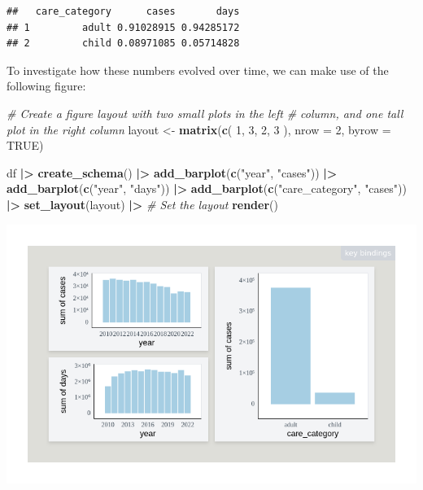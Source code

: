 \documentclass[
]{book}
\newenvironment{Shaded}{\begin{snugshade}}{\end{snugshade}}
\newcommand{\AttributeTok}[1]{\textcolor[rgb]{0.13,0.29,0.53}{#1}}
\newcommand{\CommentTok}[1]{\textcolor[rgb]{0.56,0.35,0.01}{\textit{#1}}}
\newcommand{\ConstantTok}[1]{\textcolor[rgb]{0.56,0.35,0.01}{#1}}
\newcommand{\DecValTok}[1]{\textcolor[rgb]{0.00,0.00,0.81}{#1}}
\newcommand{\FunctionTok}[1]{\textcolor[rgb]{0.13,0.29,0.53}{\textbf{#1}}}
\newcommand{\NormalTok}[1]{#1}
\newcommand{\OtherTok}[1]{\textcolor[rgb]{0.56,0.35,0.01}{#1}}
\newcommand{\SpecialCharTok}[1]{\textcolor[rgb]{0.81,0.36,0.00}{\textbf{#1}}}
\newcommand{\StringTok}[1]{\textcolor[rgb]{0.31,0.60,0.02}{#1}}
\theoremstyle{definition}
\theoremstyle{definition}
\theoremstyle{definition}
\theoremstyle{definition}
\theoremstyle{remark}
\begin{document}
\begin{verbatim}
##   care_category      cases       days
## 1         adult 0.91028915 0.94285172
## 2         child 0.08971085 0.05714828
\end{verbatim}

To investigate how these numbers evolved over time, we can make use of the following figure:

\begin{Shaded}
\begin{Highlighting}[]
\CommentTok{\# Create a figure layout with two small plots in the left}
\CommentTok{\# column, and one tall plot in the right column}
\NormalTok{layout }\OtherTok{\textless{}{-}} \FunctionTok{matrix}\NormalTok{(}\FunctionTok{c}\NormalTok{(}
  \DecValTok{1}\NormalTok{, }\DecValTok{3}\NormalTok{,}
  \DecValTok{2}\NormalTok{, }\DecValTok{3}
\NormalTok{), }\AttributeTok{nrow =} \DecValTok{2}\NormalTok{, }\AttributeTok{byrow =} \ConstantTok{TRUE}\NormalTok{)}

\NormalTok{df }\SpecialCharTok{|\textgreater{}}
  \FunctionTok{create\_schema}\NormalTok{() }\SpecialCharTok{|\textgreater{}}
  \FunctionTok{add\_barplot}\NormalTok{(}\FunctionTok{c}\NormalTok{(}\StringTok{"year"}\NormalTok{, }\StringTok{"cases"}\NormalTok{)) }\SpecialCharTok{|\textgreater{}}
  \FunctionTok{add\_barplot}\NormalTok{(}\FunctionTok{c}\NormalTok{(}\StringTok{"year"}\NormalTok{, }\StringTok{"days"}\NormalTok{)) }\SpecialCharTok{|\textgreater{}}
  \FunctionTok{add\_barplot}\NormalTok{(}\FunctionTok{c}\NormalTok{(}\StringTok{"care\_category"}\NormalTok{, }\StringTok{"cases"}\NormalTok{)) }\SpecialCharTok{|\textgreater{}}
  \FunctionTok{set\_layout}\NormalTok{(layout) }\SpecialCharTok{|\textgreater{}} \CommentTok{\# Set the layout}
  \FunctionTok{render}\NormalTok{() }
\end{Highlighting}
\end{Shaded}

\begin{center}\includegraphics[width=1\linewidth,height=1\textheight]{./figures/example-cases-days-children} \end{center}
\end{document}

